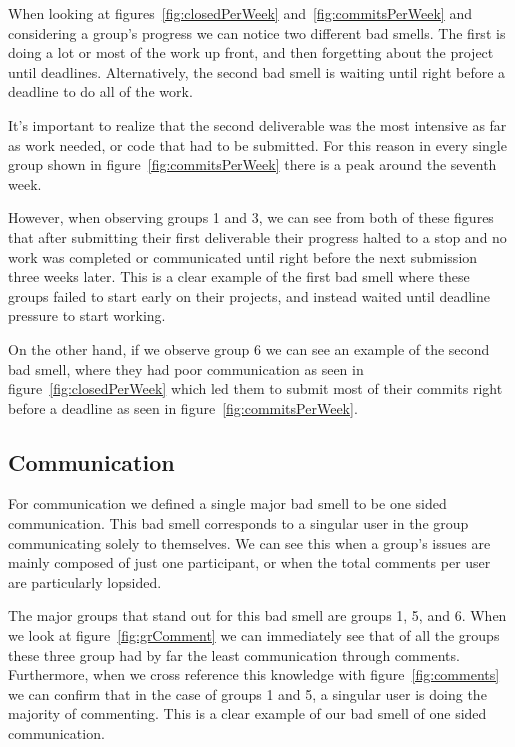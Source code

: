 \documentclass{acm_proc_article-sp}
\begin{document}
When looking at figures~\ref{fig:closedPerWeek} and~\ref{fig:commitsPerWeek} and considering a group's progress we can notice two different bad smells. The first is doing a lot or most of the work up front, and then forgetting about the project until deadlines. Alternatively, the second bad smell is waiting until right before a deadline to do all of the work. 

It's important to realize that the second deliverable was the most intensive as far as work needed, or code that had to be submitted. For this reason in every single group shown in figure~\ref{fig:commitsPerWeek} there is a peak around the seventh week. 

However, when observing groups 1 and 3, we can see from both of these figures that after submitting their first deliverable their progress halted to a stop and no work was completed or communicated until right before the next submission three weeks later. This is a clear example of the first bad smell where these groups failed to start early on their projects, and instead waited until deadline pressure to start working.

On the other hand, if we observe group 6 we can see an example of the second bad smell, where they had poor communication as seen in figure~\ref{fig:closedPerWeek} which led them to submit most of their commits right before a deadline as seen in figure~\ref{fig:commitsPerWeek}.

\subsection{Communication}

For communication we defined a single major bad smell to be one sided communication. This bad smell corresponds to a singular user in the group communicating solely to themselves. We can see this when a group's issues are mainly composed of just one participant, or when the total comments per user are particularly lopsided.

The major groups that stand out for this bad smell are groups 1, 5, and 6. When we look at figure~\ref{fig:grComment} we can immediately see that of all the groups these three group had by far the least communication through comments. Furthermore, when we cross reference this knowledge with figure~\ref{fig:comments} we can confirm that in the case of groups 1 and 5, a singular user is doing the majority of commenting. This is a clear example of our bad smell of one sided communication.
\end{document}
